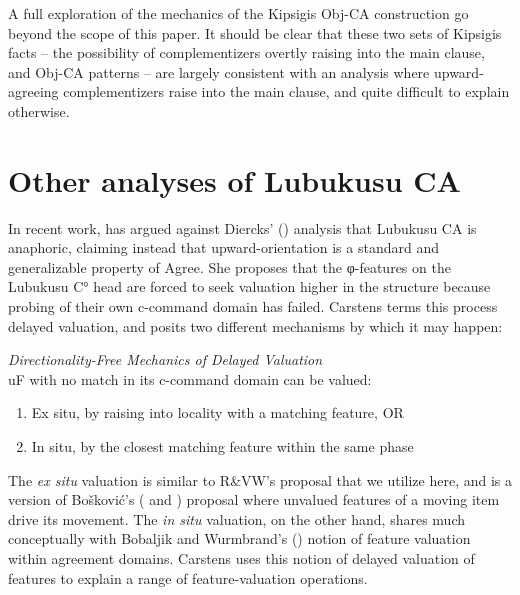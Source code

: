 \documentclass[output=paper
,modfonts
,nonflat
]{langsci/langscibook}
\begin{document}
A full exploration of the mechanics of the Kipsigis Obj-CA construction go beyond the scope of this paper. It should be clear that these two sets of Kipsigis facts -- the possibility of complementizers overtly raising into the main clause, and Obj-CA patterns -- are largely consistent with an analysis where upward-agreeing complementizers raise into the main clause, and quite difficult to explain otherwise. 

\section{Other analyses of Lubukusu CA }\label{sectioncarstens}

In recent work, \citet{Carstens:2016} has argued against Diercks’ (\citeyear{Diercks:2013}) analysis that Lubukusu CA is anaphoric, claiming instead that upward-orientation is a standard and generalizable property of Agree. She proposes that the  φ-features on the Lubukusu C° head are forced to seek valuation higher in the structure because probing of their own c-command domain has failed. Carstens terms this process delayed valuation, and posits two different mechanisms by which it may happen:

\begin{exe}
\ex \textit{Directionality-Free Mechanics of Delayed Valuation} \citep[3]{Carstens:2016}\\
	uF with no match in its c-command domain can be valued:
	\begin{enumerate}
		\item Ex situ, by raising into locality with a matching feature, OR
		\item In situ, by the closest matching feature within the same phase
	\end{enumerate}
\end{exe}

{\noindent}The \textit{ex situ} valuation is similar to R\&VW's proposal that we utilize here, and is a version of Bo\v{s}kovi\'{c}'s (\citeyear{Boskovic:2007b} and \citeyear{Boskovic:2011}) proposal where unvalued features of a moving item drive its movement. The \textit{in situ} valuation, on the other hand, shares much conceptually with Bobaljik and Wurmbrand's (\citeyear{BobaljikWurmbrand:2005}) notion of feature valuation within agreement domains. Carstens uses this notion of delayed valuation of features to explain a range of feature-valuation operations.
\end{document}
